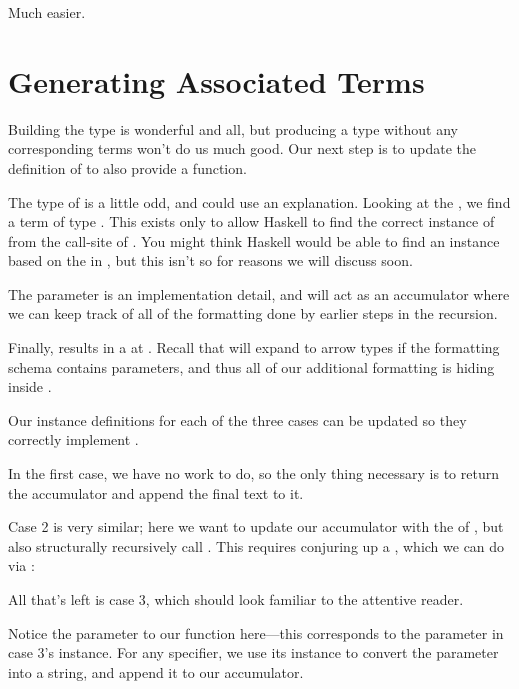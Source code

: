 \documentclass[book.tex]{subfiles}
\begin{document}
Much easier.

\section{Generating Associated Terms}

Building the type  is wonderful and all, but producing a type
without any corresponding terms won't do us much good. Our next step is to
update the definition of  to also provide a  function.


The type of  is a little odd, and could use an explanation. Looking
at the , we find a term of type . This  exists only
to allow Haskell to find the correct instance of  from the
call-site of . You might think Haskell would be able to find an
instance based on the  in , but this isn't so for reasons we
will discuss soon.

The parameter  is an implementation detail, and will act as an
accumulator where we can keep track of all of the formatting done by earlier
steps in the recursion.

Finally,  results in a  at . Recall that
 will expand to arrow types if the formatting schema contains
parameters, and thus all of our additional formatting is hiding inside .

Our instance definitions for each of the three cases can be updated so they
correctly implement .

In the first case, we have no work to do, so the only thing necessary is to
return the accumulator and append the final text to it.


Case 2 is very similar; here we want to update our accumulator with the
 of , but also structurally recursively call .
This requires conjuring up a , which we can do via
:


All that's left is case 3, which should look familiar to the attentive reader.


Notice the  parameter to our  function here---this
corresponds to the  parameter in case 3's  instance. For
any specifier, we use its  instance to convert the parameter into a
string, and append it to our accumulator.
\end{document}
